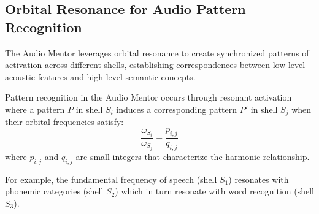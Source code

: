 \subsection{Orbital Resonance for Audio Pattern Recognition}

The Audio Mentor leverages orbital resonance to create synchronized patterns of activation across different shells, establishing correspondences between low-level acoustic features and high-level semantic concepts.

\begin{theorem}
Pattern recognition in the Audio Mentor occurs through resonant activation where a pattern $P$ in shell $S_i$ induces a corresponding pattern $P'$ in shell $S_j$ when their orbital frequencies satisfy:
\begin{equation}
\frac{\omega_{S_i}}{\omega_{S_j}} = \frac{p_{i,j}}{q_{i,j}}
\end{equation}
where $p_{i,j}$ and $q_{i,j}$ are small integers that characterize the harmonic relationship.
\end{theorem}

For example, the fundamental frequency of speech (shell $S_1$) resonates with phonemic categories (shell $S_2$) which in turn resonate with word recognition (shell $S_3$).

